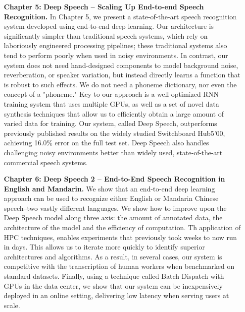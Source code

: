 \begin{itemize}
    \item [{\bf Chapter 5:}]{\bf Deep Speech -- Scaling Up End-to-end Speech
        Recognition.} In Chapter 5, we present a state-of-the-art speech
        recognition system developed using end-to-end deep learning. Our
        architecture is significantly simpler than traditional speech systems,
        which rely on laboriously engineered processing pipelines; these
        traditional systems also tend to perform poorly when used in noisy
        environments. In contrast, our system does not need hand-designed
        components to model background noise, reverberation, or speaker
        variation, but instead directly learns a function that is robust to
        such effects. We do not need a phoneme dictionary, nor even the concept
        of a "phoneme." Key to our approach is a well-optimized RNN training
        system that uses multiple GPUs, as well as a set of novel data
        synthesis techniques that allow us to efficiently obtain a large amount
        of varied data for training. Our system, called Deep Speech,
        outperforms previously published results on the widely studied
        Switchboard Hub5'00, achieving 16.0\% error on the full test set. Deep
        Speech also handles challenging noisy environments better than widely
        used, state-of-the-art commercial speech systems.

    \item [{\bf Chapter 6:}]{\bf Deep Speech 2 -- End-to-End Speech Recognition
        in English and Mandarin.} We show that an end-to-end deep learning
        approach can be used to recognize either English or Mandarin Chinese
        speech–two vastly different languages. We show how to improve upon the
        Deep Speech model along three axis: the amount of annotated data, the
        architecture of the model and the efficiency of computation.  Th
        application of HPC techniques, enables experiments that previously took
        weeks to now run in days. This allows us to iterate more quickly to
        identify superior architectures and algorithms.  As a result, in
        several cases, our system is competitive with the transcription of
        human workers when benchmarked on standard datasets.  Finally, using a
        technique called Batch Dispatch with GPUs in the data center, we show
        that our system can be inexpensively deployed in an online setting,
        delivering low latency when serving users at scale.


\end{itemize}
